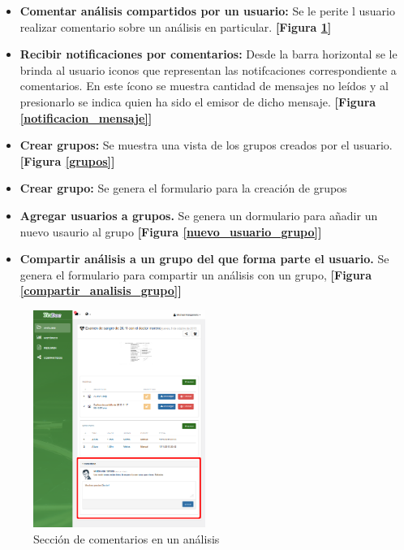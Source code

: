 	\begin{itemize}
		\item \textbf{Comentar análisis compartidos por un usuario:} Se le perite l usuario realizar comentario sobre un análisis en particular. \textbf{[Figura \ref{realizar_comentario}]}
		\item \textbf{Recibir notificaciones por comentarios:} Desde la barra horizontal se le brinda al usuario iconos que representan las notifcaciones correspondiente a comentarios. En este ícono se muestra cantidad de mensajes no leídos y al presionarlo se indica quien ha sido el emisor de dicho mensaje. \textbf{[Figura \ref{notificacion_mensaje}]}
		\item \textbf{Crear grupos: } Se muestra una vista de los grupos creados por el usuario. \textbf{[Figura  \ref{grupos}]}
		\item \textbf{Crear grupo: } Se genera el formulario para la creación de grupos 
		\item \textbf{Agregar usuarios a grupos.} Se genera un dormulario para añadir un nuevo usaurio al grupo \textbf{[Figura \ref{nuevo_usuario_grupo}]}
		\item \textbf{Compartir análisis a un grupo del que forma parte el usuario.} Se genera el formulario para compartir un análisis con un grupo, \textbf{[Figura \ref{compartir_analisis_grupo}]}
	\end{itemize}
	
	
	    \begin{figure}[h]
	    	\centering
	    	\includegraphics[width=0.5\textwidth]{img/realizar_comentario}
	    	\caption{Sección de comentarios en un análisis}
	    	\label{realizar_comentario}
	    \end{figure}


